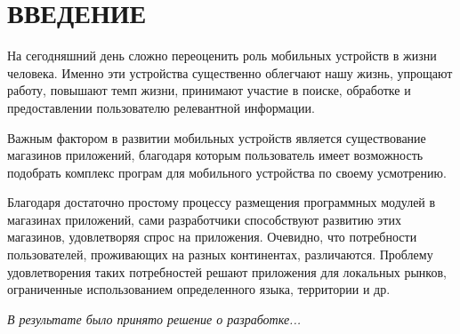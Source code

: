 \section*{ВВЕДЕНИЕ}

На сегодняшний день сложно переоценить роль мобильных устройств в жизни человека.
Именно эти устройства существенно облегчают нашу жизнь, упрощают работу,
повышают темп жизни, принимают участие в поиске, обработке и предоставлении
пользователю релевантной информации.

Важным фактором в развитии мобильных устройств является
существование магазинов приложений, благодаря которым пользователь имеет
возможность подобрать комплекс програм для мобильного устройства по своему усмотрению.

Благодаря достаточно простому процессу размещения программных модулей в магазинах
приложений, сами разработчики способствуют развитию этих магазинов, удовлетворяя
спрос на приложения. Очевидно, что потребности пользователей,
проживающих на разных континентах, различаются.
Проблему удовлетворения таких потребностей решают приложения для локальных рынков,
ограниченные использованием определенного языка, территории и др.

\textit{В результате было принято решение о разработке...}





